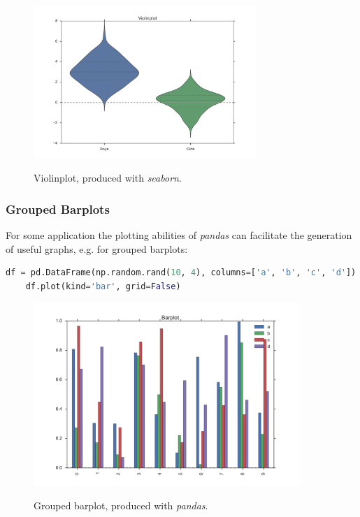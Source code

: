 \begin{figure}[H]
  \centering
  \includegraphics[width=0.75\textwidth]{../Images/violinplot.png}\\
  \caption{Violinplot, produced with \emph{seaborn}.}\label{fig:violin}
\end{figure}

\subsubsection{Grouped Barplots}

For some application the plotting abilities of \emph{pandas} can facilitate the generation of useful graphs, e.g. for grouped barplots:

\begin{lstlisting}[language=Python]
    df = pd.DataFrame(np.random.rand(10, 4), columns=['a', 'b', 'c', 'd'])
    df.plot(kind='bar', grid=False)
\end{lstlisting}

\begin{figure}[H]
  \centering
  \includegraphics[width=0.9\textwidth]{../Images/barplot.png}\\
  \caption{Grouped barplot, produced with \emph{pandas}.}\label{fig:barplot}
\end{figure}


